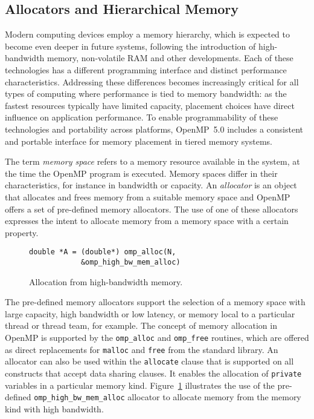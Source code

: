 \subsection{Allocators and Hierarchical Memory}
\label{sub:allocators_and_hierarchical_memory}


Modern computing devices employ a memory hierarchy, which is expected to become
even deeper in future systems, following the introduction of high-bandwidth
memory, non-volatile RAM and other developments.
Each of these technologies has a different programming interface and distinct
performance characteristics.
Addressing these differences becomes increasingly critical for all types of
computing where performance is tied to memory bandwidth: as the fastest
resources typically have limited capacity, placement choices have direct
influence on application performance.
To enable programmability of these technologies and portability across
platforms, OpenMP~5.0 includes a consistent and portable interface for memory
placement in tiered memory systems.


The term \emph{memory space} refers to a memory resource available in the
system, at the time the OpenMP program is executed.
Memory spaces differ in their characteristics, for instance in bandwidth or
capacity.
An \emph{allocator} is an object that allocates and frees memory from a suitable
memory space and OpenMP offers a set of pre-defined memory allocators.
The use of one of these allocators expresses the intent to allocate memory from
a memory space with a certain property.

\begin{figure}
\begin{verbatim}
double *A = (double*) omp_alloc(N,
            &omp_high_bw_mem_alloc)
\end{verbatim}
\caption{Allocation from high-bandwidth memory.\label{fig:allocators}}
\end{figure}

The pre-defined memory allocators support the selection of a memory space with
large capacity, high bandwidth or low latency, or memory local to a particular
thread or thread team, for example.
The concept of memory allocation in OpenMP is supported by the
\texttt{omp\_alloc} and \texttt{omp\_free} routines, which are offered as direct
replacements for \texttt{malloc} and \texttt{free} from the standard library.
An allocator can also be used within the \texttt{allocate} clause that is
supported on all constructs that accept data sharing clauses.
It enables the allocation of \texttt{private} variables in a particular memory
kind.
Figure~\ref{fig:allocators} illustrates the use of the pre-defined
\texttt{omp\_high\_bw\_mem\_alloc} allocator to allocate memory from the memory
kind with high bandwidth.


